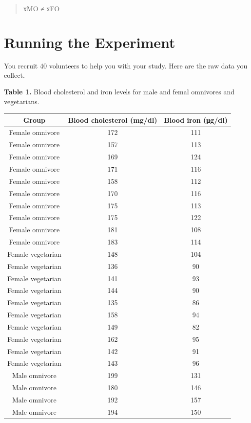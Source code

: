 \documentclass[
]{book}
\begin{document}
\begin{quote}
x̅MO ≠ x̅FO
\end{quote}

\hypertarget{running-the-experiment-1}{%
\section{Running the Experiment}\label{running-the-experiment-1}}

You recruit 40 volunteers to help you with your study. Here are the raw data you collect.

\textbf{Table 1.} Blood cholesterol and iron levels for male and femal omnivores and vegetarians.

\begin{longtable}[]{@{}ccc@{}}
\toprule
Group & Blood cholesterol (mg/dl) & Blood iron (μg/dl) \\
\midrule
\endhead
Female omnivore & 172 & 111 \\
Female omnivore & 157 & 113 \\
Female omnivore & 169 & 124 \\
Female omnivore & 171 & 116 \\
Female omnivore & 158 & 112 \\
Female omnivore & 170 & 116 \\
Female omnivore & 175 & 113 \\
Female omnivore & 175 & 122 \\
Female omnivore & 181 & 108 \\
Female omnivore & 183 & 114 \\
Female vegetarian & 148 & 104 \\
Female vegetarian & 136 & 90 \\
Female vegetarian & 141 & 93 \\
Female vegetarian & 144 & 90 \\
Female vegetarian & 135 & 86 \\
Female vegetarian & 158 & 94 \\
Female vegetarian & 149 & 82 \\
Female vegetarian & 162 & 95 \\
Female vegetarian & 142 & 91 \\
Female vegetarian & 143 & 96 \\
Male omnivore & 199 & 131 \\
Male omnivore & 180 & 146 \\
Male omnivore & 192 & 157 \\
Male omnivore & 194 & 150 \\

\end{longtable}
\end{document}
